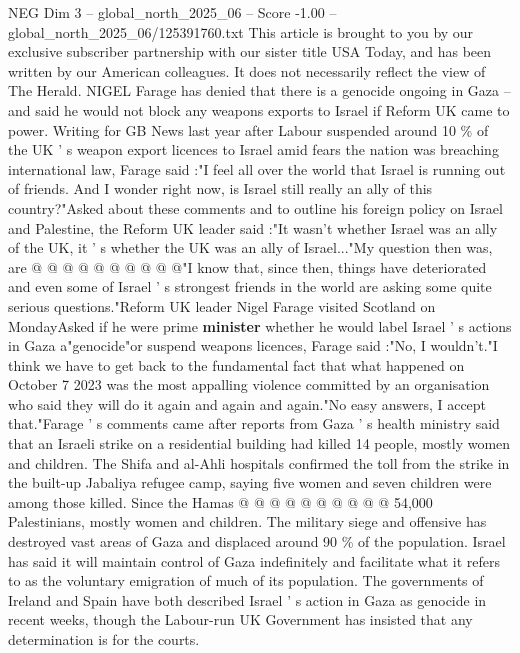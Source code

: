 \begin{textsample}{NEG Dim 3 – global\_north\_2025\_06 – Score -1.00 – global\_north\_2025\_06/125391760.txt}  \label{ex:f3_neg_349}
This article is brought to you by our exclusive subscriber partnership with our sister title USA Today, and has been written by our American colleagues.
It does not necessarily reflect the view of The Herald.
NIGEL Farage has denied that there is a genocide ongoing in Gaza -- and said he would not block any weapons exports to Israel if Reform UK came to power.
Writing for GB News last year after Labour suspended around 10 \% of the UK ' s weapon export licences to Israel amid fears the nation was breaching international law, Farage said :"I feel all over the world that Israel is running out of friends.
And I wonder right now, is Israel still really an ally of this country?"Asked about these comments and to outline his foreign policy on Israel and Palestine, the Reform UK leader said :"It wasn't whether Israel was an ally of the UK, it ' s whether the UK was an ally of Israel..."My question then was, are @ @ @ @ @ @ @ @ @ @"I know that, since then, things have deteriorated and even some of Israel ' s strongest friends in the world are asking some quite serious questions."Reform UK leader Nigel Farage visited Scotland on MondayAsked if he were prime \textbf{minister} whether he would label Israel ' s actions in Gaza a"genocide"or suspend weapons licences, Farage said :"No, I wouldn't."I think we have to get back to the fundamental fact that what happened on October 7 2023 was the most appalling violence committed by an organisation who said they will do it again and again and again."No easy answers, I accept that."Farage ' s comments came after reports from Gaza ' s health ministry said that an Israeli strike on a residential building had killed 14 people, mostly women and children.
The Shifa and al-Ahli hospitals confirmed the toll from the strike in the built-up Jabaliya refugee camp, saying five women and seven children were among those killed.
Since the Hamas @ @ @ @ @ @ @ @ @ @ 54,000 Palestinians, mostly women and children.
The military siege and offensive has destroyed vast areas of Gaza and displaced around 90 \% of the population.
Israel has said it will maintain control of Gaza indefinitely and facilitate what it refers to as the voluntary emigration of much of its population.
The governments of Ireland and Spain have both described Israel ' s action in Gaza as genocide in recent weeks, though the Labour-run UK Government has insisted that any determination is for the courts.

\end{textsample}
